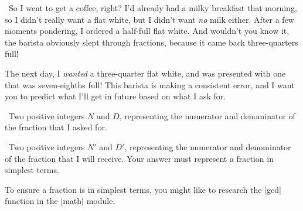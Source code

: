 

\Question\ So I went to get a coffee, right? I'd already had a milky breakfast that
morning, so I didn't really want a flat white, but I didn't want \emph{no} milk either.
After a few moments pondering, I ordered a half-full flat white. And wouldn't you know it,
the barista obviously slept through fractions, because it came back three-quarters full!

The next day, I \emph{wanted} a three-quarter flat white, and was presented with one
that was seven-eighths full! This barista is making a consistent error, and I want you to
predict what I'll get in future based on what I ask for.

\Input\ Two positive integers $N$ and $D$, representing the numerator and denominator of
the fraction that I asked for.

\Output\ Two positive integers $N'$ and $D'$, representing the numerator and denominator
of the fraction that I will receive. Your answer must represent a fraction in simplest
terms.

\Sample

               {  }
               {  }

\Scratch To ensure a fraction is in simplest terms, you might like to research the
\pycode|gcd| function in the \pycode|math| module.
